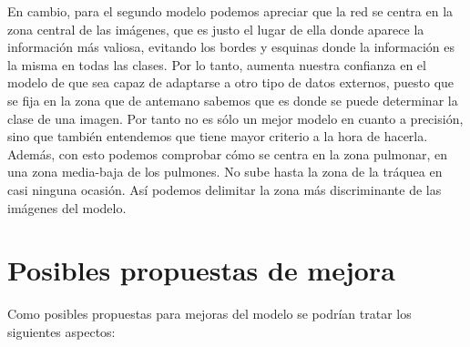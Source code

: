 \documentclass[11pt,a4paper]{article}
\theoremstyle{definition}
\begin{document}
En cambio, para el segundo modelo podemos apreciar que la red se centra en la zona central de las imágenes, que es justo el lugar de ella donde aparece la información más valiosa, evitando los bordes y esquinas donde la información es la misma en todas las clases.  Por lo tanto, aumenta nuestra confianza en el modelo de que sea capaz de adaptarse a otro tipo de datos externos, puesto que se fija en la zona que de antemano sabemos que es donde se puede determinar la clase de una imagen.  Por tanto no es sólo un mejor modelo en cuanto a precisión, sino que también entendemos que tiene mayor criterio a la hora de hacerla. Además, con esto podemos comprobar cómo se centra en la zona pulmonar,  en una zona media-baja de los pulmones.  No sube hasta la zona de la tráquea en casi ninguna ocasión. Así podemos delimitar la zona más discriminante de las imágenes del modelo.

\section{Posibles propuestas de mejora}

Como posibles propuestas para mejoras del modelo se podrían tratar los siguientes aspectos:
\end{document}
